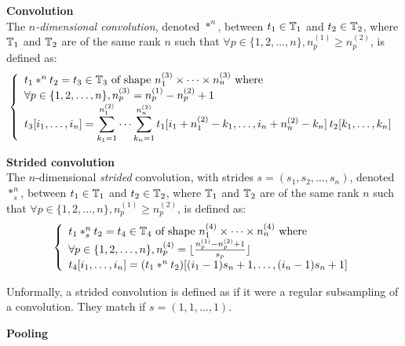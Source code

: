 \begin{definition}\textbf{Convolution}\\
The \emph{$n$-dimensional convolution}, denoted $\ast^n$, between $t_1 \in \mathbb{T}_1$ and $t_2 \in \mathbb{T}_2$, where $\mathbb{T}_1$ and $\mathbb{T}_2$ are of the same rank $n$ such that $\forall p \in \{1, 2, \ldots, n\}, n_p^{(1)} \ge n_p^{(2)}$, is defined as:
\begin{gather*}
\left\{
  \begin{array}{l}
    t_1 \ast^n t_2 = t_3 \in  \mathbb{T}_3 \text{ of shape } n_1^{(3)} \times \cdots \times n_n^{(3)}
    \text{ where} \\
    \forall p \in \{1, 2, \ldots, n\}, n_p^{(3)} = n_p^{(1)} - n_p^{(2)} + 1 \\
    t_3[i_1, \ldots, i_n] =
    \displaystyle \sum_{k_1=1}^{n_1^{(2)}} \cdots \sum_{k_n=1}^{n_n^{(2)}}
    t_1[i_1 + n_1^{(2)} - k_1, \ldots, i_n + n_n^{(2)} - k_n] \hspace{2pt} t_2[k_1, \ldots, k_n] \\
  \end{array}
\right.
\end{gather*}
\label{def:convdef}
\end{definition}

\begin{definition}\textbf{Strided convolution}\\
The $n$-dimensional \emph{strided} convolution, with strides $s = (s_1, s_2, \ldots, s_n)$, denoted $\ast^n_s$, between $t_1 \in \mathbb{T}_1$ and $t_2 \in \mathbb{T}_2$, where $\mathbb{T}_1$ and $\mathbb{T}_2$ are of the same rank $n$ such that $\forall p \in \{1, 2, \ldots, n\}, n_p^{(1)} \ge n_p^{(2)}$, is defined as:
\begin{gather*}
\left\{
  \begin{array}{l}
    t_1 \ast^n_s t_2 = t_4 \in  \mathbb{T}_4 \text{ of shape } n_1^{(4)} \times \cdots \times n_n^{(4)}
    \text{ where} \\
    \forall p \in \{1, 2, \ldots, n\}, n_p^{(4)} = \lfloor\frac{n_p^{(1)} - n_p^{(2)} + 1}{s_p}\rfloor \\
    t_4[i_1, \ldots, i_n] = (t_1 \ast^n t_2)[(i_1 - 1)s_n + 1, \ldots, (i_n - 1)s_n + 1]\\
  \end{array}
\right.
\end{gather*}
\end{definition}

\begin{remark}
Unformally, a strided convolution is defined as if it were a regular subsampling of a convolution. They match if $s = (1,1,\ldots,1)$.
\end{remark}

\begin{definition}\textbf{Pooling}\\
\todo{}
\end{definition}